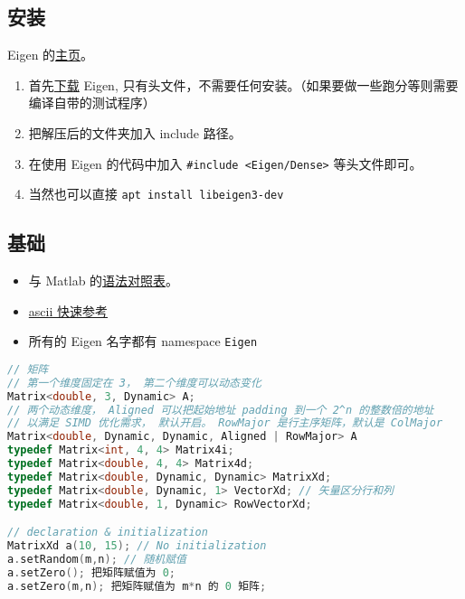 
\subsection{安装}
Eigen 的\href{http://eigen.tuxfamily.org/index.php?title=Main_Page}{主页}。
\begin{enumerate}
\item 首先\href{http://eigen.tuxfamily.org/index.php?title=Main_Page#Documentation}{下载} Eigen, 只有头文件，不需要任何安装。（如果要做一些跑分等则需要编译自带的测试程序）
\item 把解压后的文件夹加入 include 路径。
\item 在使用 Eigen 的代码中加入 \verb|#include <Eigen/Dense>| 等头文件即可。
\item 当然也可以直接 \verb`apt install libeigen3-dev`
\end{enumerate}

\subsection{基础}
\begin{itemize}
\item 与 Matlab 的\href{https://eigen.tuxfamily.org/dox/AsciiQuickReference.txt}{语法对照表}。
\item \href{https://eigen.tuxfamily.org/dox/AsciiQuickReference.txt}{ascii 快速参考}
\item 所有的 Eigen 名字都有 namespace \verb|Eigen|
\end{itemize}

\begin{lstlisting}[language=cpp]
// 矩阵
// 第一个维度固定在 3， 第二个维度可以动态变化
Matrix<double, 3, Dynamic> A;
// 两个动态维度， Aligned 可以把起始地址 padding 到一个 2^n 的整数倍的地址
// 以满足 SIMD 优化需求， 默认开启。 RowMajor 是行主序矩阵，默认是 ColMajor
Matrix<double, Dynamic, Dynamic, Aligned | RowMajor> A 
typedef Matrix<int, 4, 4> Matrix4i;
typedef Matrix<double, 4, 4> Matrix4d;
typedef Matrix<double, Dynamic, Dynamic> MatrixXd;
typedef Matrix<double, Dynamic, 1> VectorXd; // 矢量区分行和列
typedef Matrix<double, 1, Dynamic> RowVectorXd;

// declaration & initialization
MatrixXd a(10, 15); // No initialization
a.setRandom(m,n); // 随机赋值
a.setZero(); 把矩阵赋值为 0;
a.setZero(m,n); 把矩阵赋值为 m*n 的 0 矩阵;
\end{lstlisting}

